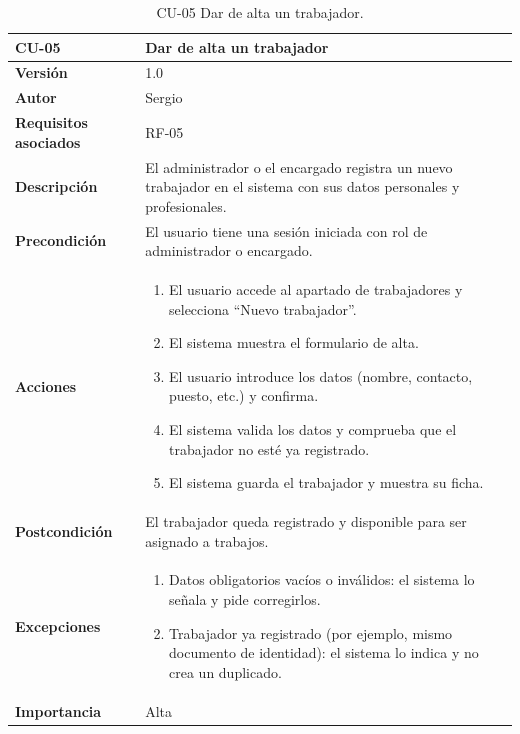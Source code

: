 \begin{table}[p]
	\centering
	\begin{tabularx}{\linewidth}{ p{} p{} }
		\toprule
		\textbf{CU-05}    & \textbf{Dar de alta un trabajador}\\
		\toprule
		\textbf{Versión}              & 1.0    \\
		\textbf{Autor}                & Sergio \\
		\textbf{Requisitos asociados} & RF-05 \\
		\textbf{Descripción}          & El administrador o el encargado registra un nuevo trabajador en el sistema con sus datos personales y profesionales. \\
		\textbf{Precondición}         & El usuario tiene una sesión iniciada con rol de administrador o encargado. \\
		\textbf{Acciones}             &
		\begin{enumerate}
			\def\labelenumi{\arabic{enumi}.}
			\tightlist
			\item El usuario accede al apartado de trabajadores y selecciona ``Nuevo trabajador''.
			\item El sistema muestra el formulario de alta.
			\item El usuario introduce los datos (nombre, contacto, puesto, etc.) y confirma.
			\item El sistema valida los datos y comprueba que el trabajador no esté ya registrado.
			\item El sistema guarda el trabajador y muestra su ficha.
		\end{enumerate}\\
		\textbf{Postcondición}        & El trabajador queda registrado y disponible para ser asignado a trabajos. \\
		\textbf{Excepciones}          &
		\begin{enumerate}
			\def\labelenumi{\arabic{enumi}.}
			\tightlist
			\item Datos obligatorios vacíos o inválidos: el sistema lo señala y pide corregirlos.
			\item Trabajador ya registrado (por ejemplo, mismo documento de identidad): el sistema lo indica y no crea un duplicado.
		\end{enumerate}\\
		\textbf{Importancia}          & Alta \\
		\bottomrule
	\end{tabularx}
	\caption{CU-05 Dar de alta un trabajador.}
\end{table}

